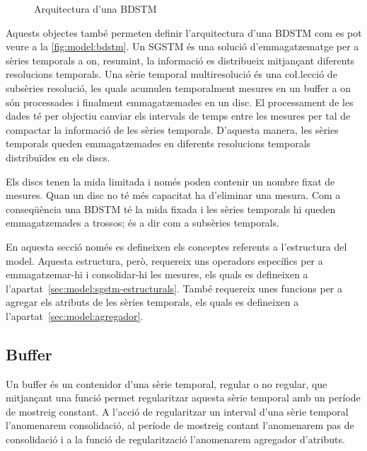 \begin{figure}[tp]
\centering

\caption{Arquitectura d'una BDSTM}
\label{fig:model:bdstm}
\end{figure}


Aquests objectes també permeten definir l'arquitectura d'una BDSTM com
es pot veure a la \autoref{fig:model:bdstm}.  Un SGSTM és una solució
d'emmagatzematge per a sèries temporals a on, resumint, la informació
es distribueix mitjançant diferents resolucions temporals.  Una sèrie
temporal multiresolució és una co\l.lecció de subsèries resolució, les
quals acumulen temporalment mesures en un buffer a on són processades
i finalment emmagatzemades en un disc. El processament de les dades té
per objectiu canviar els intervals de temps entre les mesures per tal
de compactar la informació de les sèries temporals. D'aquesta manera,
les sèries temporals queden emmagatzemades en diferents resolucions
temporals distribuïdes en els discs.

Els discs tenen la mida limitada i només poden contenir un nombre
fixat de mesures. Quan un disc no té més capacitat ha d'eliminar una
mesura. Com a conseqüència una BDSTM té la mida fixada i les sèries
temporals hi queden emmagatzemades a trossos; és a dir com a subsèries
temporals. 


En aquesta secció només es defineixen els conceptes referents a
l'estructura del model. Aquesta estructura, però, requereix uns
operadors específics per a emmagatzemar-hi i consolidar-hi les
mesures, els quals es defineixen a
l'apartat~\ref{sec:model:sgstm-estructurals}. També requereix unes
funcions per a agregar els atributs de les sèries temporals, els quals
es defineixen a l'apartat~\ref{sec:model:agregador}.




\subsection{Buffer}\label{sec:model:buffer}

Un buffer és un contenidor d'una sèrie temporal, regular o no regular, que mitjançant una funció permet regularitzar aquesta sèrie temporal amb un període de mostreig constant. A l'acció de regularitzar un interval d'una sèrie temporal l'anomenarem consolidació, al període de mostreig contant l'anomenarem pas de consolidació i a la funció de regularització l'anomenarem agregador d'atributs.

